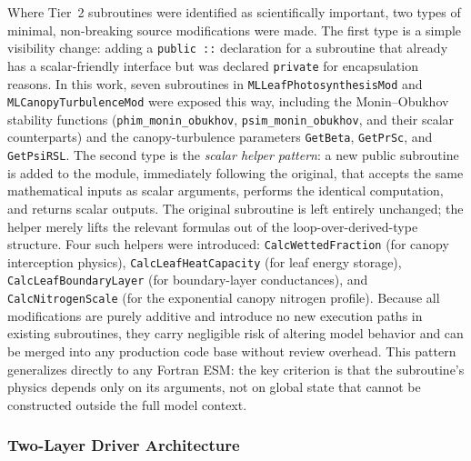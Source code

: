 Where Tier~2 subroutines were identified as scientifically important, two types of
minimal, non-breaking source modifications were made.  The first type is a simple
visibility change: adding a \texttt{public~::} declaration for a subroutine that
already has a scalar-friendly interface but was declared \texttt{private} for
encapsulation reasons.  In this work, seven subroutines in
\texttt{MLLeafPhotosynthesisMod} and \texttt{MLCanopyTurbulenceMod} were exposed
this way, including the Monin--Obukhov stability functions
(\texttt{phim\_monin\_obukhov}, \texttt{psim\_monin\_obukhov}, and their scalar
counterparts) and the canopy-turbulence parameters \texttt{GetBeta},
\texttt{GetPrSc}, and \texttt{GetPsiRSL}.  The second type is the \emph{scalar
helper pattern}: a new public subroutine is added to the module, immediately
following the original, that accepts the same mathematical inputs as scalar
arguments, performs the identical computation, and returns scalar outputs.  The
original subroutine is left entirely unchanged; the helper merely lifts the
relevant formulas out of the loop-over-derived-type structure.  Four such helpers
were introduced: \texttt{CalcWettedFraction} (for canopy interception physics),
\texttt{CalcLeafHeatCapacity} (for leaf energy storage), \texttt{CalcLeafBoundaryLayer}
(for boundary-layer conductances), and \texttt{CalcNitrogenScale} (for the
exponential canopy nitrogen profile).  Because all modifications are purely additive
and introduce no new execution paths in existing subroutines, they carry negligible
risk of altering model behavior and can be merged into any production code base
without review overhead.  This pattern generalizes directly to any Fortran ESM: the
key criterion is that the subroutine's physics depends only on its arguments, not on
global state that cannot be constructed outside the full model context.

\subsubsection{Two-Layer Driver Architecture}

